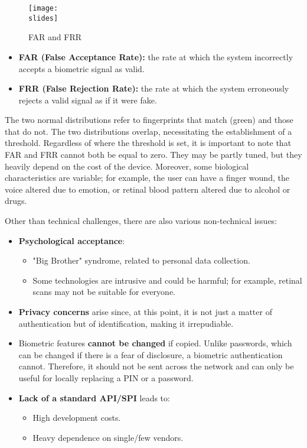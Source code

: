 \begin{figure}[h]
  \centering
  \texttt{[image: \\slides]}
  \caption{FAR and FRR}
\end{figure}

\begin{itemize}
  \item \textbf{FAR (False Acceptance Rate):} the rate at which the system incorrectly accepts a biometric signal as valid.
  \item \textbf{FRR (False Rejection Rate):} the rate at which the system erroneously rejects a valid signal as if it were fake.
\end{itemize}
The two normal distributions refer to fingerprints that match (green) and those that do not. The two distributions overlap, necessitating the establishment of a threshold. Regardless of where the threshold is set, it is important to note that FAR and FRR cannot both be equal to zero.
They may be partly tuned, but they heavily depend on the cost of the device. Moreover, some biological characteristics are variable; for example, the user can have a finger wound, the voice altered due to emotion, or retinal blood pattern altered due to alcohol or drugs.

Other than technical challenges, there are also various non-technical issues:
\begin{itemize}
  \item \textbf{Psychological acceptance}:
        \begin{itemize}
          \item "Big Brother" syndrome, related to personal data collection.
          \item Some technologies are intrusive and could be harmful; for example, retinal scans may not be suitable for everyone.
        \end{itemize}
  \item \textbf{Privacy concerns} arise since, at this point, it is not just a matter of authentication but of identification, making it irrepudiable.
  \item Biometric features \textbf{cannot be changed} if copied. Unlike passwords, which can be changed if there is a fear of disclosure, a biometric authentication cannot. Therefore, it should not be sent across the network and can only be useful for locally replacing a PIN or a password.
  \item \textbf{Lack of a standard API/SPI} leads to:
        \begin{itemize}
          \item High development costs.
          \item Heavy dependence on single/few vendors.
        \end{itemize}
\end{itemize}

